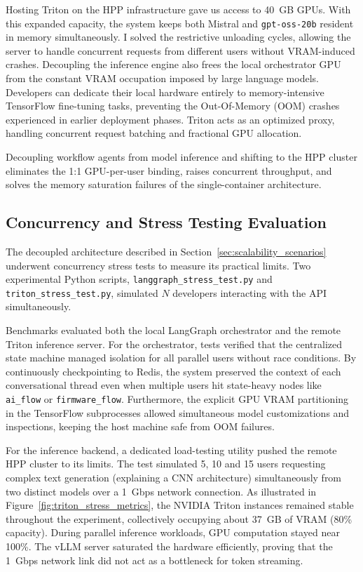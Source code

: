 \begin{enumerate}
          Hosting Triton on the HPP infrastructure gave us access to 40~GB GPUs. With this expanded capacity, the system keeps both Mistral and \texttt{gpt-oss-20b} resident in memory simultaneously. I solved the restrictive unloading cycles, allowing the server to handle concurrent requests from different users without VRAM-induced crashes. Decoupling the inference engine also frees the local orchestrator GPU from the constant VRAM occupation imposed by large language models. Developers can dedicate their local hardware entirely to memory-intensive TensorFlow fine-tuning tasks, preventing the Out-Of-Memory (OOM) crashes experienced in earlier deployment phases. Triton acts as an optimized proxy, handling concurrent request batching \cite{kwon2023efficientmemorymanagementlarge} and fractional GPU allocation.
\end{enumerate}

Decoupling workflow agents from model inference and shifting to the HPP cluster eliminates the 1:1 GPU-per-user binding, raises concurrent throughput, and solves the memory saturation failures of the single-container architecture.

\subsection{Concurrency and Stress Testing Evaluation}
\label{sec:stress_testing}

The decoupled architecture described in Section~\ref{sec:scalability_scenarios} underwent concurrency stress tests to measure its practical limits. Two experimental Python scripts, \texttt{langgraph\_stress\_test.py} and \texttt{triton\_stress\_test.py}, simulated $N$ developers interacting with the API simultaneously.

Benchmarks evaluated both the local LangGraph orchestrator and the remote Triton inference server. For the orchestrator, tests verified that the centralized state machine managed isolation for all parallel users without race conditions. By continuously checkpointing to Redis, the system preserved the context of each conversational thread even when multiple users hit state-heavy nodes like \texttt{ai\_flow} or \texttt{firmware\_flow}. Furthermore, the explicit GPU VRAM partitioning in the TensorFlow subprocesses allowed simultaneous model customizations and inspections, keeping the host machine safe from OOM failures.

For the inference backend, a dedicated load-testing utility pushed the remote HPP cluster to its limits. The test simulated 5, 10 and 15 users requesting complex text generation (explaining a CNN architecture) simultaneously from two distinct models over a 1~Gbps network connection. As illustrated in Figure~\ref{fig:triton_stress_metrics}, the NVIDIA Triton instances remained stable throughout the experiment, collectively occupying about 37~GB of VRAM (80\% capacity). During parallel inference workloads, GPU computation stayed near 100\%. The vLLM server saturated the hardware efficiently, proving that the 1~Gbps network link did not act as a bottleneck for token streaming.

